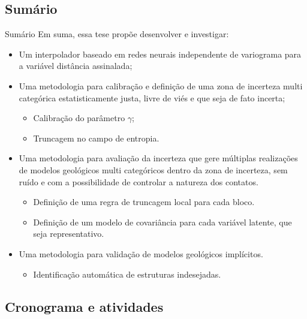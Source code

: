 \documentclass[aspectratio=169]{beamer}
\begin{document}
\subsection{Sumário}

\begin{frame}{Sumário}
	Em suma, essa tese propõe desenvolver e investigar:


\begin{itemize}
	\item Um interpolador baseado em redes neurais independente de variograma para a variável distância assinalada;
	\item Uma metodologia para calibração e definição de uma zona de incerteza multi categórica estatisticamente justa, livre de viés e que seja de fato incerta;
	\begin{itemize}
		\item{Calibração do parâmetro $\gamma$;}
		\item{Truncagem no campo de entropia.}
	\end{itemize}
	\item Uma metodologia para avaliação da incerteza que gere múltiplas realizações de modelos geológicos multi categóricos dentro da zona de incerteza, sem ruído e com a possibilidade de controlar a natureza dos contatos.\
	\begin{itemize}
		\item{Definição de uma regra de truncagem local para cada bloco.}
		\item{Definição de um modelo de covariância para cada variável latente, que seja representativo.}
	\end{itemize}
	\item Uma metodologia para validação de modelos geológicos implícitos.
	\begin{itemize}
		\item{Identificação automática de estruturas indesejadas.}
	\end{itemize}
 
\end{itemize}

\end{frame}

\subsection{Cronograma e atividades}
\end{document}
